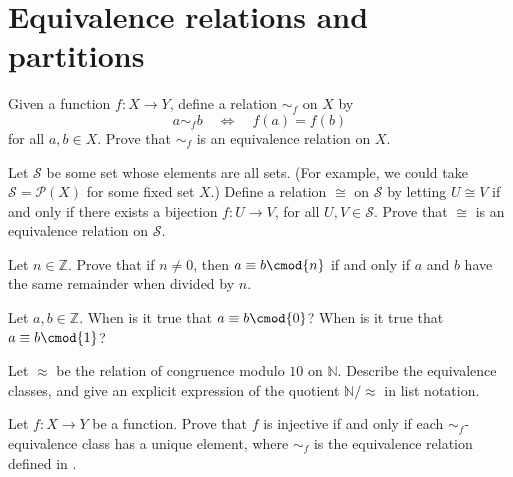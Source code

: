 \section{Equivalence relations and partitions}


\begin{exercise}
\label{exEquivalenceRelationFromFunction}
Given a function $f : X \to Y$, define a relation $\sim_f$ on $X$ by
\[ a \sim_f b \quad \Leftrightarrow \quad f(a) = f(b) \]
for all $a,b \in X$. Prove that $\sim_f$ is an equivalence relation on $X$.
\end{exercise}

\begin{exercise}
\label{exBijectionIsEquivalenceRelation}
Let $\mathcal{S}$ be some set whose elements are all sets. (For example, we could take $\mathcal{S} = \mathcal{P}(X)$ for some fixed set $X$.) Define a relation $\cong$  on $\mathcal{S}$ by letting $U \cong V$ if and only if there exists a bijection $f : U \to V$, for all $U,V \in \mathcal{S}$. Prove that $\cong$ is an equivalence relation on $\mathcal{S}$.
\end{exercise}


\begin{exercise}
Let $n \in \mathbb{Z}$. Prove that if $n \ne 0$, then $a \equiv b \cmod{n}$ if and only if $a$ and $b$ have the same remainder when divided by $n$.
\end{exercise}

\begin{exercise}
Let $a,b \in \mathbb{Z}$. When is it true that $a \equiv b \cmod{0}$? When is it true that $a \equiv b \cmod{1}$?
\end{exercise}


\begin{exercise}
Let $\approx$ be the relation of congruence modulo $10$ on $\mathbb{N}$. Describe the equivalence classes, and give an explicit expression of the quotient $\mathbb{N}/{\approx}$ in list notation.
\end{exercise}



\begin{exercise}
Let $f : X \to Y$ be a function. Prove that $f$ is injective if and only if each $\sim_f$-equivalence class has a unique element, where $\sim_f$ is the equivalence relation defined in .
\end{exercise}

